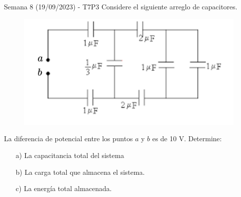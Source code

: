 \begin{frame}{Semana 8 (19/09/2023) - T7P3}
    Considere el siguiente arreglo de capacitores.
    
    \begin{figure}[H]
        \centering
        \includegraphics[scale=0.5]{figures/Q5.png}
    \end{figure}
    
    La diferencia de potencial entre los puntos $a$ y $b$ es de 10 V. Determine:
    
    \begin{itemize}
        \item[a)] La capacitancia total del sistema
        \item[b)] La carga total que almacena el sistema.
        \item[c)] La energía total almacenada.
    \end{itemize}
\end{frame}

